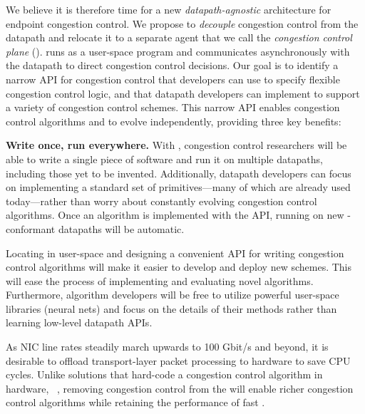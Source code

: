 We believe it is therefore time for a new {\em datapath-agnostic} architecture
for endpoint congestion control. We propose to \emph{decouple} congestion
control from the datapath and relocate it to a separate agent that we call the  {\em congestion
  control plane} (\ccp{}). \ccp{} runs as a user-space program
  and communicates asynchronously with the datapath to direct congestion control decisions. Our goal is to identify a narrow API for congestion control
that developers can use to specify flexible congestion control logic, and that
datapath developers can implement to support a variety of congestion control
schemes. This narrow API enables congestion control algorithms and
\datapaths to evolve independently, providing three key benefits:

\smallskip
\noindent
{\bf Write once, run everywhere.} With \ccp{}, congestion control researchers will be able to write a single piece of software and run it on multiple datapaths, including those yet to be invented. Additionally, datapath developers can focus on implementing a standard set of primitives---many of which are already used today---rather than worry about constantly evolving congestion control algorithms. 
Once an algorithm is implemented with the \ccp{} API, running on new \ccp{}-conformant datapaths will be automatic.

\smallskip
{} Locating \ccp in user-space and designing a convenient API for writing congestion control algorithms will make it easier to develop and deploy new schemes. 
This will ease the process of implementing and evaluating novel algorithms.
Furthermore, algorithm developers will be free to utilize powerful user-space libraries (\eg neural nets) and focus on the details of their methods rather than learning low-level datapath APIs.


\smallskip
{} 
As NIC line rates steadily march upwards to 100 Gbit/s and beyond, it is
desirable to offload transport-layer packet processing to hardware to save CPU
cycles. Unlike solutions that hard-code a congestion control algorithm in
hardware, \eg ~\cite{dcqcn}, removing congestion control from the \datapath will
enable richer congestion control algorithms while retaining the performance of
fast \datapaths.
\smallskip

